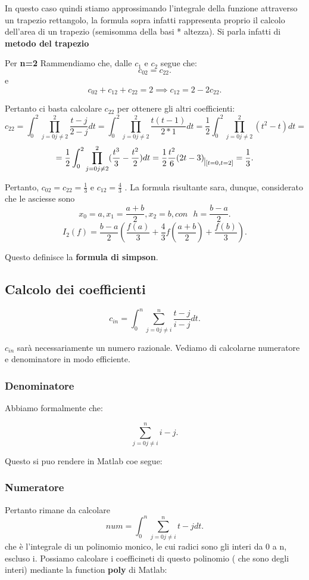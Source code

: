 \documentclass[11pt]{article}
\theoremstyle{definition}
\theoremstyle{plain}
\begin{document}
In questo caso quindi stiamo approssimando l'integrale della funzione attraverso un trapezio rettangolo, la formula sopra infatti rappresenta proprio il calcolo dell'area di un trapezio (semisomma della basi * altezza). Si parla infatti di \textbf{metodo del trapezio}

Per \textbf{n=2} Rammendiamo che, dalle $c_1$ e $c_2$ segue che:
\[
c_{02}=c_{22}
.\] 
e
\[
c_{02}+c_{12}+c_{22}=2 \implies c_{12}=2-2c_{22}
.\] 

Pertanto ci basta calcolare $c_{22}$ per ottenere gli altri coefficienti:
\[
	c_{22}=\int_{0}^{2}\prod_{j=0 j\neq 2}^{2} \frac{t-j}{2-j}dt=\int_{0}^{2}\prod_{j=0 j\neq 2}^{2} \frac{t(t-1)}{2*1}dt=\frac{1}{2}\int_{0}^{2}\prod_{j=0 j\neq 2}^{2} (t^{2}-t)dt=
	\] 
\[
=\frac{1}{2}\int_{0}^{2}\prod_{j=0 j\neq 2}^{2} (\frac{t^{3}}{3}-\frac{t^{2}}{2})dt=\frac{1}{2}\frac{t^{2}}{6}(2t-3)_{\mkern 1mu \vrule height 2ex\mkern2mu [t=0,t=2]}=\frac{1}{3}
.\] 

Pertanto, $c_{02}=c_{22}=\frac{1}{3}$  e $c_{12}=\frac{4}{3}$ . La formula risultante sara, dunque, considerato che le asciesse sono
\[
x_0=a,x_1=\frac{a+b}{2},x_2=b,con\ \ \ h=\frac{b-a}{2}
.\] 
\[
	I_2(f)=\frac{b-a}{2}(\frac{f(a)}{3}+\frac{4}{3}f(\frac{a+b}{2})+\frac{f(b)}{3})
.\] 

	Questo definisce la \textbf{formula di simpson}.
\subsection{Calcolo dei coefficienti}
\[
c_{in}=\int_{0}^{n}\sum_{j=0 j\neq i}^{n} \frac{t-j}{i-j}dt
.\] 

$c_{in}$ sarà necessariamente un numero razionale. Vediamo di calcolarne numeratore e denominatore in modo efficiente.

\subsubsection{Denominatore}
Abbiamo formalmente che:

\[
	\sum_{j=0 j\neq i}^{n} i-j
.\] 

Questo si puo rendere in Matlab coe segue:



\subsubsection{Numeratore}
Pertanto rimane da calcolare
\[
num=\int_{0}^{n}\sum_{j=0 j\neq i}^{n} t-j dt
.\] 
che è l'integrale di un polinomio monico, le cui radici sono gli interi da 0 a n, escluso i. Possiamo calcolare i coefficineti di questo polinomio ( che sono degli interi) mediante la function \textbf{poly} di Matlab:
\end{document}
